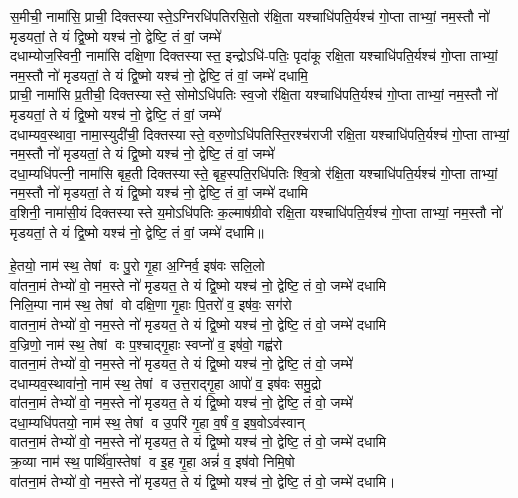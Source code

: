 स॒मीची॒ नामा॑सि॒ प्राची॒ दिक्तस्यास्ते॒ऽग्निरधि॑\-पतिरसि॒तो र॑क्षि॒ता 
यश्चाधि॑पति॒र्यश्च॑ गो॒प्ता ताभ्यां॒ नम॒स्तौ नो॑ मृडयतां॒ ते 
यं द्वि॒ष्मो यश्च॑ नो॒ द्वेष्टि॒ तं वां॒ जम्भे॑\\
दधाम्योज॒स्विनी॒ नामा॑सि दक्षि॒णा दिक्तस्यास्त॒ इन्द्रोऽधि॑-पतिः॒ पृदा॑कू रक्षि॒ता 
यश्चाधि॑पति॒र्यश्च॑ गो॒प्ता ताभ्यां॒ नम॒स्तौ नो॑ मृडयतां॒ ते 
यं द्वि॒ष्मो यश्च॑ नो॒ द्वेष्टि॒ तं वां॒ जम्भे॑ दधामि॒\\ 
प्राची॒ नामा॑सि प्र॒तीची॒ दिक्तस्यास्ते॒ सोमोऽधि॑\-पतिः स्व॒जो र॑क्षि॒ता 
यश्चाधि॑पति॒र्यश्च॑ गो॒प्ता ताभ्यां॒ नम॒स्तौ नो॑ मृडयतां॒ ते 
यं द्वि॒ष्मो यश्च॑ नो॒ द्वेष्टि॒ तं वां॒ जम्भे॑\\
दधाम्यव॒स्थावा॒ नामा॒स्युदी॑ची॒ दिक्तस्यास्ते॒ वरु॒णोऽधि॑\-पतिस्ति॒रश्च॑राजी रक्षि॒ता 
यश्चाधि॑पति॒र्यश्च॑ गो॒प्ता ताभ्यां॒ नम॒स्तौ नो॑ मृडयतां॒ ते 
यं द्वि॒ष्मो यश्च॑ नो॒ द्वेष्टि॒ तं वां॒ जम्भे॑\\
दधा॒म्यधि॑पत्नी॒ नामा॑सि बृह॒ती दिक्तस्यास्ते॒ बृह॒स्पति॒रधि॑पतिः श्वि॒त्रो र॑क्षि॒ता 
यश्चाधि॑पति॒र्यश्च॑ गो॒प्ता ताभ्यां॒ नम॒स्तौ नो॑ मृडयतां॒ ते 
यं द्वि॒ष्मो यश्च॑ नो॒ द्वेष्टि॒ तं वां॒ जम्भे॑ दधामि\\
व॒शिनी॒ नामा॑सी॒यं दिक्तस्यास्ते य॒मोऽधि॑पतिः क॒ल्माष॑ग्रीवो रक्षि॒ता 
यश्चाधि॑पति॒र्यश्च॑ गो॒प्ता ताभ्यां॒ नम॒स्तौ नो॑ मृडयतां॒ ते 
यं द्वि॒ष्मो यश्च॑ नो॒ द्वेष्टि॒ तं वां॒ जम्भे॑ दधामि॥

हे॒तयो॒ नाम॑ स्थ॒ तेषां वः पु॒रो गृ॒हा अ॒ग्निर्व॒ इष॑वः सलि॒लो\\ 
वा॑तना॒मं तेभ्यो॑ वो॒ नम॒स्ते नो॑ मृडयत॒ ते यं द्वि॒ष्मो यश्च॑ नो॒ द्वेष्टि॒ तं वो॒ जम्भे॑ दधामि\\
निलि॒म्पा नाम॑ स्थ॒ तेषां वो दक्षि॒णा गृ॒हाः पि॒तरो॑ व॒ इष॑वः॒ सग॑रो\\ 
वातना॒मं तेभ्यो॑ वो॒ नम॒स्ते नो॑ मृडयत॒ ते यं द्वि॒ष्मो यश्च॑ नो॒ द्वेष्टि॒ तं वो॒ जम्भे॑ दधामि\\
व॒ज्रिणो॒ नाम॑ स्थ॒ तेषां वः प॒श्चाद्गृ॒हाः स्वप्नो॑ व॒ इष॑वो॒ गह्व॑रो\\ 
वातना॒मं तेभ्यो॑ वो॒ नम॒स्ते नो॑ मृडयत॒ ते यं द्वि॒ष्मो यश्च॑ नो॒ द्वेष्टि॒ तं वो॒ जम्भे॑\\
दधाम्यव॒स्थावा॑नो॒ नाम॑ स्थ॒ तेषां व उत्त॒राद्गृ॒हा आपो॑ व॒ इष॑वः समु॒द्रो\\ 
वा॑तना॒मं तेभ्यो॑ वो॒ नम॒स्ते नो॑ मृडयत॒ ते यं द्वि॒ष्मो यश्च॑ नो॒ द्वेष्टि॒ तं वो॒ जम्भे॑\\
दधा॒म्यधि॑पतयो॒ नाम॑ स्थ॒ तेषां व उ॒परि॑ गृ॒हा व॒र्\mbox{}षं व॒ इष॒वोऽव॑स्वान्\\ 
वातना॒मं तेभ्यो॑ वो॒ नम॒स्ते नो॑ मृडयत॒ ते यं द्वि॒ष्मो यश्च॑ नो॒ द्वेष्टि॒ तं वो॒ जम्भे॑ दधामि\\
क्र॒व्या नाम॑ स्थ॒ पार्थि॑वा॒स्तेषां व इ॒ह गृ॒हा अन्नं॑ व॒ इष॑वो निमि॒षो\\ 
वा॑तना॒मं तेभ्यो॑ वो॒ नम॒स्ते नो॑ मृडयत॒ ते यं द्वि॒ष्मो यश्च॑ नो॒ द्वेष्टि॒ तं वो॒ जम्भे॑ दधामि।

